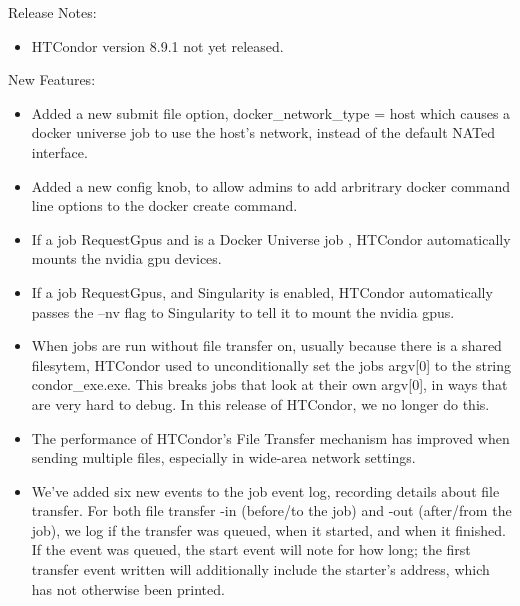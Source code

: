 \noindent Release Notes:

\begin{itemize}

\item HTCondor version 8.9.1 not yet released.

\end{itemize}


\noindent New Features:

\begin{itemize}

\item Added a new submit file option, docker\_network\_type = host
which causes a docker universe job to use the host's network,
instead of the default NATed interface.

\item Added a new config knob, 
to allow admins to add arbritrary docker command line options to
the docker create command.

\item If a job RequestGpus and is a Docker Universe job , HTCondor
automatically mounts the nvidia gpu devices.

\item If a job RequestGpus, and Singularity is enabled, HTCondor
automatically passes the --nv flag to Singularity to tell it to mount
the nvidia gpus.

\item When jobs are run without file transfer on, usually because there is a 
shared filesytem, HTCondor used to unconditionally set the jobs argv[0]
to the string condor\_exe.exe.  This breaks jobs that look at their own
argv[0], in ways that are very hard to debug.  In this release of HTCondor, 
we no longer do this.

\item The performance of HTCondor's File Transfer mechanism has improved when
	sending multiple files, especially in wide-area network settings.

\item We've added six new events to the job event log, recording details
about file transfer.  For both file transfer -in (before/to the job) and
-out (after/from the job), we log if the transfer was queued, when it started,
and when it finished.  If the event was queued, the start event will note
for how long; the first transfer event written will additionally include
the starter's address, which has not otherwise been printed.


\end{itemize}
